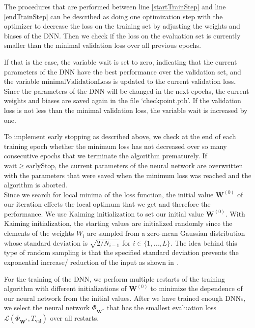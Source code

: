 The procedures that are performed between line \ref{startTrainStep} and line \ref{endTrainStep} can be described as doing one optimization step with the $\mathrm{optimizer}$ to decrease the loss on the training set by adjusting the weights and biases of the DNN. Then we check if the loss on the evaluation set is currently smaller than the minimal validation loss over all previous epochs.

If that is the case, the variable $\mathrm{wait}$ is set to zero, indicating that the current parameters of the DNN have the best performance over the validation set, and the variable $\mathrm{minimalValidationLoss}$ is updated to the current validation loss. Since the parameters of the DNN will be changed in the next epochs, the current weights and biases are saved again in the file `$\mathrm{checkpoint.pth}$'. If the validation loss is not less than the minimal validation loss, the variable $\mathrm{wait}$ is increased by one.

To implement early stopping as described above, we check at the end of each training epoch whether the minimum loss has not decreased over so many consecutive epochs that we terminate the algorithm prematurely. If $\mathrm{wait} \geq \mathrm{earlyStop}$, the current parameters of the neural network are overwritten with the parameters that were saved when the minimum loss was reached and the algorithm is aborted.\\

Since we search for local minima of the loss function, the initial value $\mathbf{W}^{(0)}$ of our iteration effects the local optimum that we get and therefore the performance. We use Kaiming initialization \cite{7410480} to set our initial value $\mathbf{W}^{(0)}$. With Kaiming initialization, the starting values are initialized randomly since the elements of the weights $W_i$ are sampled from a zero-mean Gaussian distribution whose standard deviation is $\sqrt{2/N_{i-1}}$ for $i\in\{1,\dotsc,L\}$.
The idea behind this type of random sampling is that the specified standard deviation prevents the exponential increase/ reduction of the input as shown in \cite{7410480}.

For the training of the DNN, we perform multiple restarts of the training algorithm with different initializations of $\mathbf{W}^{(0)}$ to minimize the dependence of our neural network from the initial values. After we have trained enough DNNs, we select the neural network $\Phi_{\mathbf{W}^*}$ that has the smallest evaluation loss $\mathscr{L}(\Phi_{\mathbf{W}^*},T_\mathrm{val})$ over all restarts.

